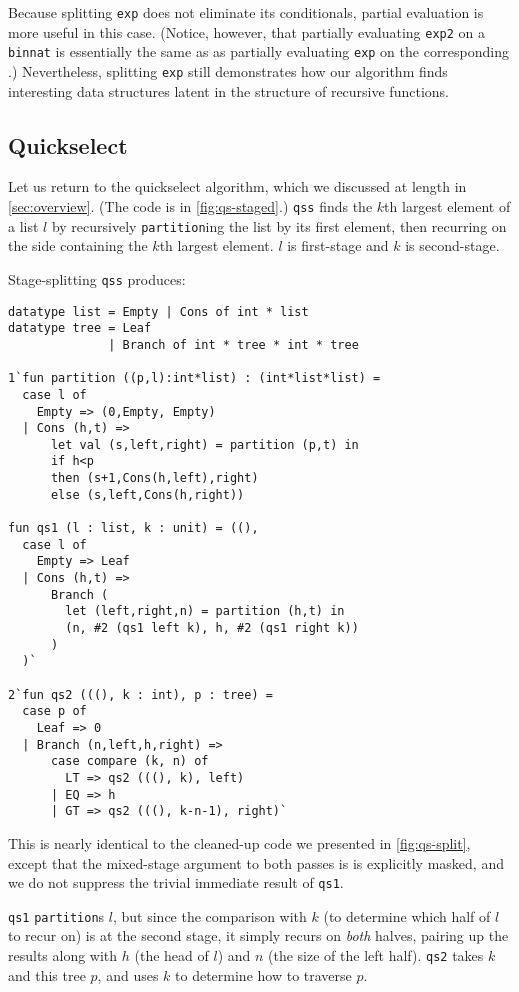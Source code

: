 Because splitting \texttt{exp} does not eliminate its conditionals, partial
evaluation is more useful in this case. (Notice, however, that partially
evaluating \texttt{exp2} on a \texttt{binnat} is essentially the same as as
partially evaluating \texttt{exp} on the corresponding \rmint.) Nevertheless,
splitting \texttt{exp} still demonstrates how our algorithm finds interesting
data structures latent in the structure of recursive functions.

\subsection{Quickselect}
\label {sec:exampleQS}

Let us return to the quickselect algorithm, which we discussed at
length in \ref{sec:overview}. (The code is in \ref{fig:qs-staged}.)
\texttt{qss} finds the $k$th largest element of a list $l$ by
recursively \texttt{partition}ing the list by its first element, then recurring
on the side containing the $k$th largest element. $l$ is first-stage and $k$ is
second-stage.

Stage-splitting \texttt{qss} produces:
%
\begin{lstlisting} 
datatype list = Empty | Cons of int * list
datatype tree = Leaf
              | Branch of int * tree * int * tree

1`fun partition ((p,l):int*list) : (int*list*list) = 
  case l of 
    Empty => (0,Empty, Empty) 
  | Cons (h,t) => 
      let val (s,left,right) = partition (p,t) in 
      if h<p 
      then (s+1,Cons(h,left),right) 
      else (s,left,Cons(h,right))

fun qs1 (l : list, k : unit) = ((), 
  case l of
    Empty => Leaf
  | Cons (h,t) => 
      Branch (
        let (left,right,n) = partition (h,t) in
        (n, #2 (qs1 left k), h, #2 (qs1 right k))
      )
  )`

2`fun qs2 (((), k : int), p : tree) = 
  case p of
    Leaf => 0
  | Branch (n,left,h,right) =>
      case compare (k, n) of 
        LT => qs2 (((), k), left) 
      | EQ => h 
      | GT => qs2 (((), k-n-1), right)`
\end{lstlisting}
%
This is nearly identical to the cleaned-up code we presented in
\ref{fig:qs-split}, except that the mixed-stage argument to both passes is
is explicitly masked, and we do not suppress the trivial immediate result of
\texttt{qs1}.

\texttt{qs1} \texttt{partition}s $l$, but since the comparison with $k$ (to
determine which half of $l$ to recur on) is at the second stage, it simply
recurs on \emph{both} halves, pairing up the results along with $h$ (the head of
$l$) and $n$ (the size of the left half). \texttt{qs2} takes $k$ and this tree
$p$, and uses $k$ to determine how to traverse $p$.


